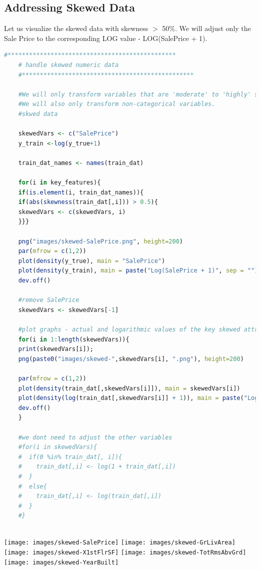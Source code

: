\documentclass[sigconf]{acmart}
\begin{document}
	
	
	\subsection{Addressing Skewed Data}

	Let us visualize the skewed data with skewness $>$ 50\%. We will adjust only the Sale Price to the corresponding LOG value - LOG(SalePrice + 1).
	
	\begin{lstlisting}[language=R]
	#***********************************************
	# handle skewed numeric data
	#************************************************
	
	#We will only transform variables that are 'moderate' to 'highly' skewed. 
	#We will also only transform non-categorical variables.
	#skwed data
	
	skewedVars <- c("SalePrice")
	y_train <-log(y_true+1)
	
	train_dat_names <- names(train_dat)
	
	for(i in key_features){
	if(is.element(i, train_dat_names)){
	if(abs(skewness(train_dat[,i])) > 0.5){
	skewedVars <- c(skewedVars, i)
	}}}
	
	png("images/skewed-SalePrice.png", height=200)
	par(mfrow = c(1,2))
	plot(density(y_true), main = "SalePrice")
	plot(density(y_train), main = paste("Log(SalePrice + 1)", sep = ""))
	dev.off()
	
	#remove SalePrice
	skewedVars <- skewedVars[-1]
	
	#plot graphs - actual and logarithmic values of the key skewed attributes only
	for(i in 1:length(skewedVars)){
	print(skewedVars[i]);
	png(paste0("images/skewed-",skewedVars[i], ".png"), height=200)
	
	par(mfrow = c(1,2))
	plot(density(train_dat[,skewedVars[i]]), main = skewedVars[i])
	plot(density(log(train_dat[,skewedVars[i]] + 1)), main = paste("Log(", skewedVars[i], " + 1)", sep = ""))
	dev.off()
	}
	
	#we dont need to adjust the other variables
	#for(i in skewedVars){
	#  if(0 %in% train_dat[, i]){
	#    train_dat[,i] <- log(1 + train_dat[,i])
	#  }
	#  else{
	#    train_dat[,i] <- log(train_dat[,i])
	#  }
	#}
	
	\end{lstlisting}
	
	\begin{center}	
		
		\texttt{[image: images/skewed-SalePrice]}		
		\texttt{[image: images/skewed-GrLivArea]}
		\texttt{[image: images/skewed-X1stFlrSF]}		
		\texttt{[image: images/skewed-TotRmsAbvGrd]}
		\texttt{[image: images/skewed-YearBuilt]}
	\end{center}
	
\end{document}
